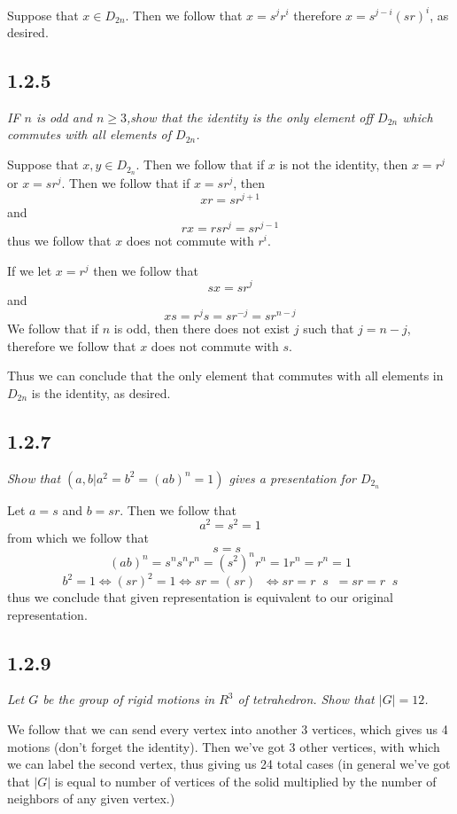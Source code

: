 \documentclass[11pt,oneside,titlepage]{book}
\DeclareMathOperator \inv {^{-1}}
\DeclareMathOperator \lra {\Leftrightarrow}
\begin{document}
Suppose that $x \in D_{2n}$. Then we follow that
$x = s^j r^i$
therefore $x = s^{j - i}(sr)^{i}$, as desired.

\subsection*{1.2.5}

\textit{IF $n$ is odd and $n \geq 3$,show that the identity is the only element off $D_{2n}$
  which commutes with all elements of $D_{2n}$.}

Suppose that $x, y \in D_{2_n}$. Then we follow that if $x$ is not the identity, then
$x = r^j$ or $x = sr^j$. Then we follow that if $x = sr^j$, then
$$xr = sr^{j + 1}$$
and
$$rx = r s r^j = s r^{j - 1}$$
thus we follow that $x$ does not commute with $r^i$.

If we let $x = r^j$ then we follow that
$$sx = sr^j$$
and
$$xs = r^j s = s r^{-j} = s r^{n - j}$$
We follow that if $n$ is odd, then there does not exist $j$ such that $j = n - j$, therefore
we follow that $x$ does not commute with $s$.

Thus we can conclude that the only element that commutes with all elements in $D_{2n}$ is
the identity, as desired.

\subsection*{1.2.7}

\textit{Show that $(a, b| a^2 = b^2 = (ab)^n = 1)$ gives a presentation for $D_{2_n}$ }

Let $a = s$ and $b = sr$. Then we follow that 
$$a^2 = s^2 = 1$$
from which we follow that
$$s = s\inv$$
$$(ab)^n = s^n s^n r^n = (s^2)^n r^n = 1 r^n = r^n = 1$$
$$b^2 = 1 \lra (sr)^2 = 1 \lra sr = (sr)\inv \lra sr = r\inv s\inv = sr = r\inv s$$
thus we conclude that given representation is equivalent to our original representation.

\subsection*{1.2.9}

\textit{Let $G$ be the group of rigid motions in $R^3$ of tetrahedron. Show that
  $|G| = 12$.}

We follow that we can send every vertex into another 3 vertices, which gives us 4
motions (don't forget the identity). Then we've got 3 other vertices, with which
we can label the second vertex, thus giving us 24 total cases (in general we've
got that $|G|$ is equal to number of vertices of the solid multiplied by the number of
neighbors of any given vertex.)
\end{document}
